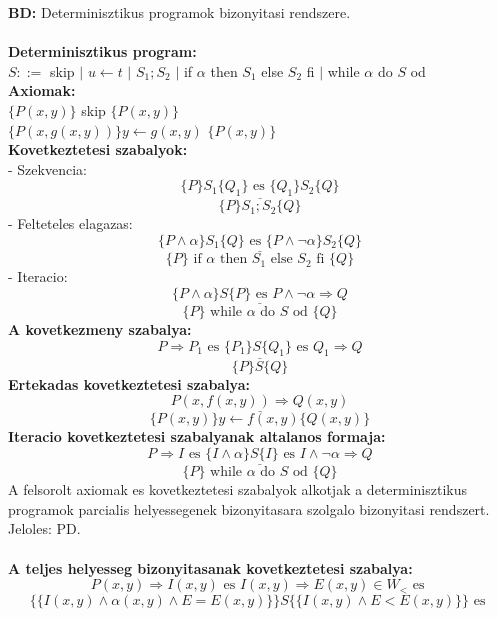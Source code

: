 \documentclass[a4paper,10pt]{article}
\begin{document}
\textbf{BD:} Determinisztikus programok bizonyitasi rendszere.\\\\
\textbf{Determinisztikus program:}\\
$S::=$ skip $\vert$ $u\leftarrow t$ $\vert$ $S_1;S_2$ $\vert$ if $\alpha$ then $S_1$ else $S_2$ fi $\vert$ while $\alpha$ do $S$ od\\
\textbf{Axiomak:}\\
\indent $\lbrace P(x, y)\rbrace$ skip $\lbrace P(x, y)\rbrace$\\
\indent $\lbrace P(x,g(x,y))\rbrace y \leftarrow g(x,y)$ $\lbrace P(x,y)\rbrace$\\
\textbf{Kovetkeztetesi szabalyok:}\\
- Szekvencia:
$$\underline{\lbrace P\rbrace S_1 \lbrace Q_1\rbrace \text{ es } \lbrace Q_1\rbrace S_2\lbrace Q\rbrace}$$
$$\lbrace P\rbrace S_1;S_2 \lbrace Q\rbrace$$
- Felteteles elagazas:
$$\underline{\lbrace P \wedge \alpha\rbrace S_1\lbrace Q\rbrace \text{ es } \lbrace P \wedge \neg\alpha \rbrace S_2 \lbrace Q\rbrace}$$
$$\lbrace P\rbrace \text{ if } \alpha \text{ then } S_1 \text{ else } S_2 \text{ fi } \lbrace Q\rbrace$$
- Iteracio:
$$\underline{\lbrace P\wedge\alpha\rbrace S \lbrace P\rbrace \text{ es } P\wedge \neg\alpha \Rightarrow Q}$$
$$\lbrace P\rbrace \text{ while } \alpha \text{ do } S \text{ od } \lbrace Q\rbrace$$
\textbf{A kovetkezmeny szabalya:}
$$\underline{P \Rightarrow P_1 \text{ es } \lbrace P_1\rbrace S \lbrace Q_1\rbrace \text{ es } Q_1 \Rightarrow Q}$$
$$\lbrace P\rbrace S \lbrace Q\rbrace$$
\textbf{Ertekadas kovetkeztetesi szabalya:}
$$\underline{P(x,f(x,y)) \Rightarrow Q(x,y)}$$
$$\lbrace P(x,y)\rbrace y\leftarrow f(x,y) \lbrace Q(x,y)\rbrace$$
\textbf{Iteracio kovetkeztetesi szabalyanak altalanos formaja:}
$$\underline{P\Rightarrow I \text{ es } \lbrace I\wedge \alpha\rbrace S \lbrace I\rbrace \text{ es } I\wedge\neg\alpha \Rightarrow Q}$$
$$\lbrace P\rbrace \text{ while } \alpha \text{ do } S \text{ od } \lbrace Q\rbrace$$
A felsorolt axiomak es kovetkeztetesi szabalyok alkotjak a determinisztikus programok parcialis helyessegenek bizonyitasara szolgalo bizonyitasi rendszert.\\
Jeloles: PD.\\\\
\textbf{A teljes helyesseg bizonyitasanak kovetkeztetesi szabalya:}
$$P(x,y)\Rightarrow I(x,y) \text{ es } I(x,y) \Rightarrow E(x,y)\in W_< \text{ es }$$
$$\lbrace\lbrace I(x,y)\wedge\alpha(x,y)\wedge E=E(x,y)\rbrace\rbrace S \lbrace\lbrace I(x,y)\wedge E<E(x,y)\rbrace\rbrace \text{ es }$$
\end{document}
